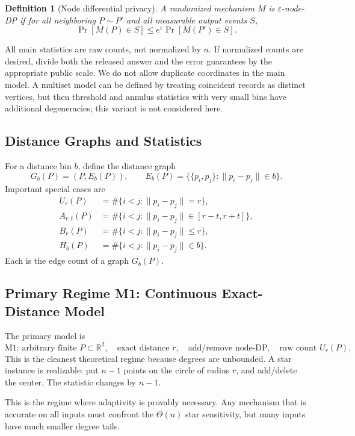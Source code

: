\documentclass[11pt]{article}
\newtheorem{definition}[theorem]{Definition}
\newcommand{\R}{\mathbb{R}}
\newcommand{\eps}{\varepsilon}
\begin{document}
\begin{definition}[Node differential privacy]
A randomized mechanism \(M\) is \(\eps\)-node-DP if for all neighboring \(P\sim P'\) and all measurable output events \(S\),
\[
\Pr[M(P)\in S]\le e^\eps \Pr[M(P')\in S].
\]
\end{definition}

All main statistics are raw counts, not normalized by \(n\). If normalized counts are desired, divide both the released answer and the error guarantees by the appropriate public scale. We do not allow duplicate coordinates in the main model. A multiset model can be defined by treating coincident records as distinct vertices, but then threshold and annulus statistics with very small bins have additional degeneracies; this variant is not considered here.

\subsection{Distance Graphs and Statistics}

For a distance bin \(b\), define the distance graph
\[
G_b(P)=(P,E_b(P)),\qquad
E_b(P)=\bigl\{\{p_i,p_j\}:\|p_i-p_j\|\in b\bigr\}.
\]
Important special cases are
\begin{align*}
U_r(P)&=\#\{i<j:\|p_i-p_j\|=r\},\\
A_{r,t}(P)&=\#\{i<j:\|p_i-p_j\|\in [r-t,r+t]\},\\
B_r(P)&=\#\{i<j:\|p_i-p_j\|\le r\},\\
H_b(P)&=\#\{i<j:\|p_i-p_j\|\in b\}.
\end{align*}
Each is the edge count of a graph \(G_b(P)\).

\subsection{Primary Regime M1: Continuous Exact-Distance Model}

The primary model is
\[
\text{M1: arbitrary finite }P\subset \R^2,\quad \text{exact distance }r,\quad \text{add/remove node-DP},\quad \text{raw count }U_r(P).
\]
This is the cleanest theoretical regime because degrees are unbounded. A star instance is realizable: put \(n-1\) points on the circle of radius \(r\), and add/delete the center. The statistic changes by \(n-1\).

This is the regime where adaptivity is provably necessary. Any mechanism that is accurate on all inputs must confront the \(\Theta(n)\) star sensitivity, but many inputs have much smaller degree tails.
\end{document}
